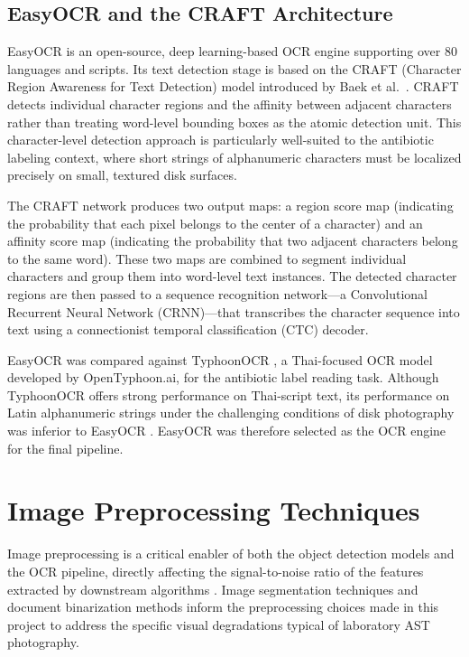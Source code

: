 \subsection{EasyOCR and the CRAFT Architecture}

EasyOCR \cite{jaidedai2024easyocr} is an open-source, deep learning-based OCR engine
supporting over 80 languages and scripts. Its text detection stage is based on the CRAFT
(Character Region Awareness for Text Detection) model introduced by Baek et al.\
\cite{baek2019craft}. CRAFT detects individual character regions and the affinity between
adjacent characters rather than treating word-level bounding boxes as the atomic detection
unit. This character-level detection approach is particularly well-suited to the antibiotic
labeling context, where short strings of alphanumeric characters must be localized precisely
on small, textured disk surfaces.

The CRAFT network produces two output maps: a region score map (indicating the probability
that each pixel belongs to the center of a character) and an affinity score map (indicating
the probability that two adjacent characters belong to the same word). These two maps are
combined to segment individual characters and group them into word-level text instances.
The detected character regions are then passed to a sequence recognition network---a
Convolutional Recurrent Neural Network (CRNN)---that transcribes the character sequence
into text using a connectionist temporal classification (CTC) decoder.

EasyOCR \cite{jaidedai2024easyocr} was compared against TyphoonOCR \cite{typhoonocr2025},
a Thai-focused OCR model developed by OpenTyphoon.ai, for the antibiotic label reading task.
Although TyphoonOCR offers strong performance on Thai-script text, its performance on Latin
alphanumeric strings under the challenging conditions of disk photography was inferior to
EasyOCR \cite{baek2019craft,jaidedai2024easyocr}. EasyOCR was therefore selected as the
OCR engine for the final pipeline.

\section{Image Preprocessing Techniques}

Image preprocessing is a critical enabler of both the object detection models and the OCR
pipeline, directly affecting the signal-to-noise ratio of the features extracted by downstream
algorithms \cite{qi2021image_enhancement}. Image segmentation techniques \cite{jasim2021segmentation,dhanachandra2015}
and document binarization methods \cite{yang2024binarization} inform the preprocessing choices
made in this project to address the specific visual degradations typical of laboratory AST photography.

